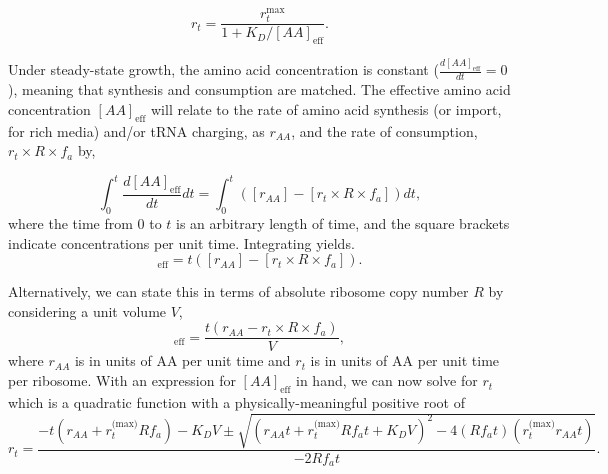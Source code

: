 \begin{equation}
r_t = \frac{r_{t}^{\text{max}}}{1 + K_D/[AA]_{\text{eff}}}.
\label{eq:rt_kd_simple}
\end{equation}

Under steady-state growth, the amino acid concentration is constant
($\frac{d[AA]_\text{eff}}{dt}=0$), meaning that synthesis and consumption are matched.
The effective amino acid concentration $[AA]_{\text{eff}}$ will relate to the rate of
amino acid synthesis (or import, for rich media) and/or tRNA charging, 
as $r_{AA}$,  and the rate of consumption,
$r_t\times R \times f_a$ by,

\begin{equation}
\int_{0}^{t} \frac{d[AA]_{\text{eff}}}{dt} dt =  \int_{0}^{t}([r_{AA}] - [r_t\times R \times f_a]) dt,
\label{eq:aaeff_int}
\end{equation}
where the time from 0 to $t$ is an arbitrary length of time, and the square
brackets indicate concentrations per unit time. 
Integrating  yields.
\begin{equation}
[AA]_{\text{eff}} =  t([r_{AA}] - [r_t \times R \times f_a]).
\label{eq:aaeff_concs}
\end{equation}

Alternatively, we can state this in terms of absolute ribosome copy number $R$
by considering a unit volume $V$,
\begin{equation}
   [AA]_\text{eff} = \frac{t(r_{AA} - r_t \times R \times f_a)}{V},
   \label{eq:aa_final}
\end{equation} 
where $r_{AA}$ is in units of AA per unit time and $r_t$ is in units of AA per
unit time per ribosome. With an expression for $[AA]_\text{eff}$ in hand, we can now solve
 for $r_t$ which is a quadratic function with a
physically-meaningful positive root of
\begin{equation}
r_t = \frac{-t(r_{AA} + r_t^\text{(max)}Rf_a) - K_D V \pm \sqrt{(r_{AA}t + r_t^\text{(max)}Rf_at + K_D V)^2 - 4(Rf_at)(r_t^\text{(max)}r_{AA} t)}}{-2Rf_at}.
\label{eq:rt_root}
\end{equation}

